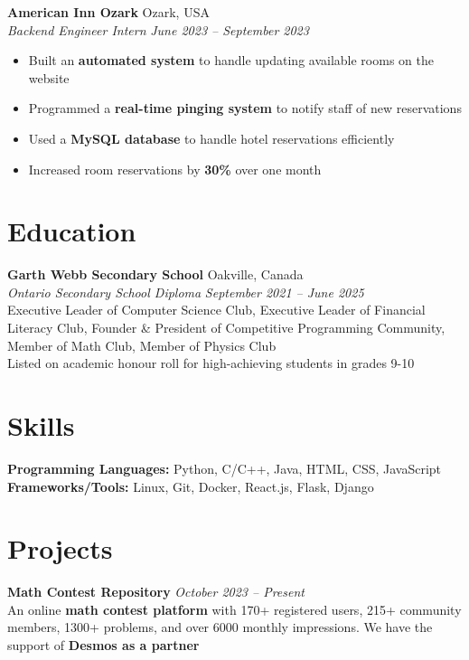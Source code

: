 \documentclass[a4paper,10pt]{article}
\begin{document}
\medskip

\textbf{American Inn Ozark} \hfill Ozark, USA\\
\textit{Backend Engineer Intern} \hfill \textit{June 2023 -- September 2023}
\begin{itemize}
    \item Built an \textbf{automated system} to handle updating available rooms on the website
    \item Programmed a \textbf{real-time pinging system} to notify staff of new reservations
    \item Used a \textbf{MySQL database} to handle hotel reservations efficiently
    \item Increased room reservations by \textbf{30\%} over one month
\end{itemize}

\section*{Education}
\textbf{Garth Webb Secondary School} \hfill Oakville, Canada\\
\textit{Ontario Secondary School Diploma} \hfill \textit{September 2021 -- June 2025}\\
Executive Leader of Computer Science Club, Executive Leader of Financial Literacy Club, Founder \& President of Competitive Programming Community, Member of Math Club, Member of Physics Club\\
Listed on academic honour roll for high-achieving students in grades 9-10


\section*{Skills}
\textbf{Programming Languages:} Python, C/C++, Java, HTML, CSS, JavaScript\\
\textbf{Frameworks/Tools:} Linux, Git, Docker, React.js, Flask, Django

\section*{Projects}
\textbf{Math Contest Repository} \hfill \textit{October 2023 -- Present}\\
An online \textbf{math contest platform} with 170+ registered users, 215+ community members, 1300+ problems, and over 6000 monthly impressions. We have the support of \textbf{Desmos as a partner}

\medskip
\end{document}
